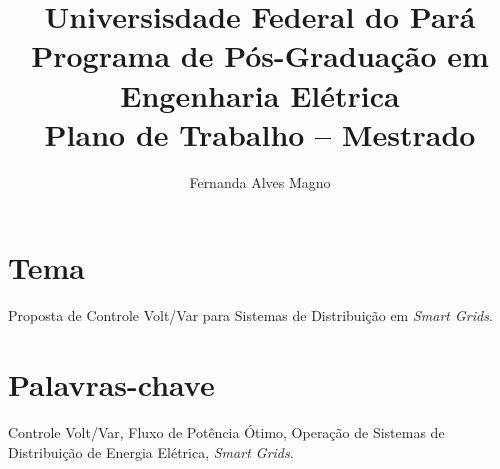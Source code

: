 \documentclass[]{IEEEphot}
\title{Universisdade Federal do Pará\\Programa de Pós-Graduação em Engenharia Elétrica\\Plano de Trabalho – Mestrado}
\begin{document}
\author{Fernanda Alves Magno}


\maketitle




	\section{Tema}
Proposta de Controle Volt/Var para Sistemas de Distribuição em \textit{Smart Grids}.

\section{Palavras-chave}
Controle Volt/Var, Fluxo de Potência Ótimo, Operação de Sistemas de Distribuição de Energia Elétrica, \textit{Smart Grids}.
\end{document}
